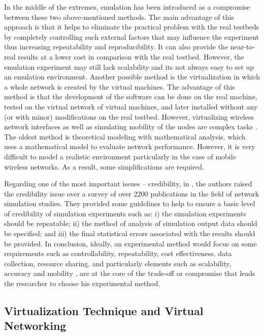 In the middle of the extremes, emulation has been introduced as a compromise between these two above-mentioned methods. The main advantage of this approach is that it helps to eliminate the practical problem with the real testbeds by completely controlling such external factors that may influence the experiment thus increasing repeatability and reproducibility. It can also provide the near-to-real results at a lower cost in comparison with the real testbed. However, the emulation experiment may still lack scalability and its not always easy to set up an emulation environment. Another possible method is the virtualization in which a whole network is created by the virtual machines. The advantage of this method is that the development of the software can be done on the real machine, tested on the virtual network of virtual machines, and later installed without any  (or with minor) modifications on the real testbed. However, virtualizing wireless network interfaces as well as simulating mobility of the nodes are complex tasks \cite{virtual_WiFi, LTE_virtualization}. The oldest method is theoretical modeling with mathematical analysis, which uses a mathematical model to evaluate network performance. However, it is very difficult to model a realistic environment particularly in the case of mobile wireless networks. As a result, some simplifications are required. 

Regarding one of the most important issues – credibility, in \cite{credibility_simulation}, the authors raised the credibility issue over a survey of over 2200 publications in the field of network simulation studies. They provided some guidelines to help to ensure a basic level of credibility of simulation experiments such as: i) the simulation experiments should be repeatable; ii) the method of analysis of simulation output data should be specified; and iii) the final statistical errors associated with the results should be provided. In conclusion, ideally, an experimental method would focus on some requirements such as controllability, repeatability, cost effectiveness, data collection, resource sharing, and particularly elements such as scalability, accuracy and mobility \cite{ASSERT}, are at the core of the trade-off or compromise that leads the researcher to choose his experimental method.

\subsection{Virtualization Technique and Virtual Networking}

